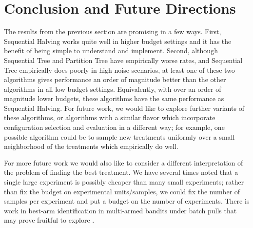 \documentclass[11pt]{article}
\begin{document}
\section{Conclusion and Future Directions}
The results from the previous section are promising in a few ways. First, Sequential Halving works quite well in higher budget settings and it has the benefit of being simple to understand and implement. Second, although Sequential Tree and Partition Tree have empirically worse rates, and Sequential Tree empirically does poorly in high noise scenarios, at least one of these two algorithms gives performance an order of magnitude better than the other algorithms in all low budget settings. Equivalently, with over an order of magnitude lower budgets, these algorithms have the same performance as Sequential Halving. For future work, we would like to explore further variants of these algorithms, or algorithms with a similar flavor which incorporate configuration selection and evaluation in a different way; for example, one possible algorithm could be to sample new treatments uniformly over a small neighborhood of the treatments which empirically do well.

For more future work we would also like to consider a different interpretation of the problem of finding the best treatment. We have several times noted that a single large experiment is possibly cheaper than many small experiments; rather than fix the budget on experimental units/samples, we could fix the number of samples per experiment and put a budget on the number of experiments. There is work in best-arm identification in multi-armed bandits under batch pulls that may prove fruitful to explore \cite{Jun2016}.

\newpage







\newpage
\end{document}
